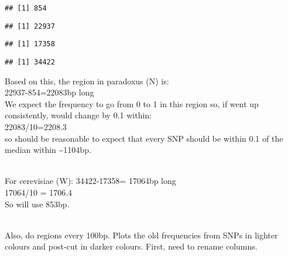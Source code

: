 \documentclass[
]{article}
\newenvironment{Shaded}{\begin{snugshade}}{\end{snugshade}}
\newcommand{\FunctionTok}[1]{\textcolor[rgb]{0.13,0.29,0.53}{\textbf{#1}}}
\newcommand{\NormalTok}[1]{#1}
\newcommand{\SpecialCharTok}[1]{\textcolor[rgb]{0.81,0.36,0.00}{\textbf{#1}}}
\begin{document}
\begin{Shaded}
\end{Shaded}

\begin{verbatim}
## [1] 854
\end{verbatim}

\begin{Shaded}
\end{Shaded}

\begin{verbatim}
## [1] 22937
\end{verbatim}

\begin{Shaded}
\end{Shaded}

\begin{verbatim}
## [1] 17358
\end{verbatim}

\begin{Shaded}
\end{Shaded}

\begin{verbatim}
## [1] 34422
\end{verbatim}

Based on this, the region in paradoxus (N) is:\\
22937-854=22083bp long\\
We expect the frequency to go from 0 to 1 in this region so, if went up
consistently, would change by 0.1 within:\\
22083/10=2208.3\\
so should be reasonable to expect that every SNP should be within 0.1 of
the median within \textasciitilde1104bp.\\
\strut \\
For cerevisiae (W): 34422-17358= 17064bp long\\
17064/10 = 1706.4\\
So will use 853bp.\\
\strut \\
Also, do regions every 100bp. Plots the old frequencies from SNPs in
lighter colours and post-cut in darker colours. First, need to rename
columns.
\end{document}
